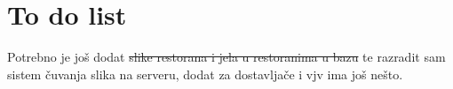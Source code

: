 \documentclass[12pt]{scrartcl}
\begin{document}
\section{To do list}
Potrebno je još dodat \st{slike restorana i jela u restoranima u bazu} te razradit sam sistem čuvanja slika na serveru, dodat za dostavljače i vjv ima još nešto. 
\end{document}
